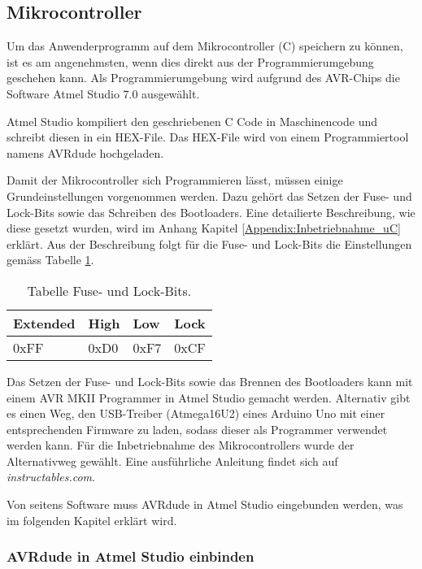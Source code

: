 \newpage
\subsection{Mikrocontroller}
\label{subsec:Inbetriebnahme_Mikrocontroller}

Um das Anwenderprogramm auf dem Mikrocontroller (\textmu C) speichern zu können, ist es am angenehmsten, wenn dies direkt aus der Programmierumgebung geschehen kann. Als Programmierumgebung wird aufgrund des AVR-Chips die Software Atmel Studio 7.0 ausgewählt.

Atmel Studio kompiliert den geschriebenen C Code in Maschinencode und schreibt diesen in ein HEX-File. Das HEX-File wird von einem Programmiertool namens AVRdude hochgeladen.\cite{verschiedene_autoren_avrdude_2019}


Damit der Mikrocontroller sich Programmieren lässt, müssen einige Grundeinstellungen vorgenommen werden. Dazu gehört das Setzen der Fuse- und Lock-Bits sowie das Schreiben des Bootloaders. Eine detailierte Beschreibung, wie diese gesetzt wurden, wird im Anhang Kapitel \ref{Appendix:Inbetriebnahme_uC} erklärt. Aus der Beschreibung folgt für die Fuse- und Lock-Bits die Einstellungen gemäss Tabelle \ref{tab:Fuse_und_Lock-Bits}.

\begin{table}[h!]
\center
\begin{tabular}{|l|l|l|l|}
\hline
\textbf{Extended} & \textbf{High} & \textbf{Low} & \textbf{Lock}\\
\hline
0xFF & 0xD0 & 0xF7 & 0xCF\\
\hline
\end{tabular}
\caption{Tabelle Fuse- und Lock-Bits.}
\label{tab:Fuse_und_Lock-Bits}
\end{table}

Das Setzen der Fuse- und Lock-Bits sowie das Brennen des Bootloaders kann mit einem AVR MKII Programmer in Atmel Studio gemacht werden. Alternativ gibt es einen Weg, den USB-Treiber (Atmega16U2) eines Arduino Uno mit einer entsprechenden Firmware zu laden, sodass dieser als Programmer verwendet werden kann. Für die Inbetriebnahme des Mikrocontrollers wurde der Alternativweg gewählt. Eine ausführliche Anleitung findet sich auf \textit{instructables.com}. \cite{vidmofollow_turn_2017}

Von seitens Software muss AVRdude in Atmel Studio eingebunden werden, was im folgenden Kapitel erklärt wird.

\subsubsection{AVRdude in Atmel Studio einbinden}\label{subsubsec:avrdude_in_atmelstudio_einbinden}

